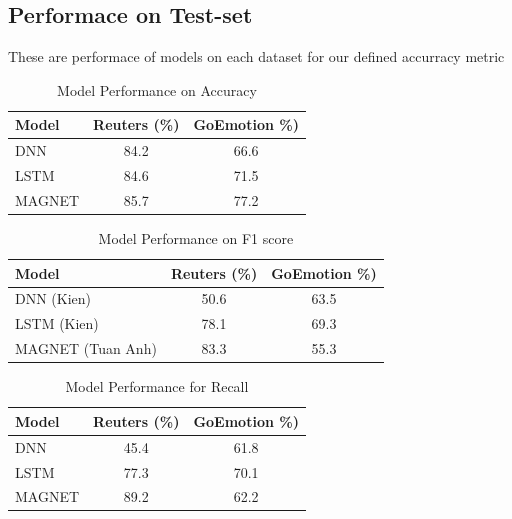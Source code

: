\documentclass{article}
\begin{document}
\subsection{Performace on Test-set}
These are performace of models on each dataset for our defined accurracy metric
\begin{table}[h!]

    \centering
    \begin{tabular}{l|c|c}
         \textbf{Model} & \textbf{Reuters (\%)} & \textbf{GoEmotion \%)} \\
         \hline
         DNN  & 84.2 & 66.6 \\
         LSTM  & 84.6 & 71.5 \\
         MAGNET  & 85.7 & 77.2 \\
    \end{tabular}
    \caption{Model Performance on Accuracy} 
    \label{tab:model_performance_comparison}
\end{table}

\begin{table}[h!]
    \centering
    \begin{tabular}{l|c|c}
         \textbf{Model} & \textbf{Reuters (\%)} & \textbf{GoEmotion \%)} \\
         \hline
         DNN (Kien) & 50.6 & 63.5 \\
         LSTM (Kien) & 78.1 & 69.3 \\
         MAGNET (Tuan Anh) & 83.3 & 55.3 \\
    \end{tabular}
    \caption{Model Performance on F1 score } 
    \label{tab:model_performance_comparison}
\end{table}

\begin{table}[h!]
    \centering
    \begin{tabular}{l|c|c}
         \textbf{Model} & \textbf{Reuters (\%)} & \textbf{GoEmotion \%)} \\
         \hline
         DNN & 45.4 & 61.8 \\
         LSTM & 77.3 & 70.1 \\
         MAGNET & 89.2 & 62.2 \\
    \end{tabular}
    \caption{Model Performance for Recall} 
    \label{tab:model_performance_comparison}
\end{table}
\end{document}

